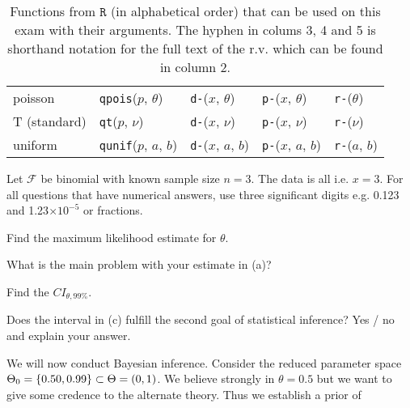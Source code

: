 \documentclass[12pt]{article}
\begin{document}
\begin{table}[htp]
\begin{tabular}{l | llll}

poisson & \texttt{qpois}($p$, $\theta$) 
& \texttt{d-}($x$, $\theta$)
& \texttt{p-}($x$, $\theta$) 
& \texttt{r-}($\theta$) \\

T (standard) & \texttt{qt}($p$, $\nu$) 
& \texttt{d-}($x$, $\nu$) 
& \texttt{p-}($x$, $\nu$)
& \texttt{r-}($\nu$) \\


uniform & \texttt{qunif}($p$, $a$, $b$) 
& \texttt{d-}($x$, $a$, $b$)
& \texttt{p-}($x$, $a$, $b$) 
& \texttt{r-}($a$, $b$) \\


\end{tabular}
\caption{Functions from $\texttt{R}$ (in alphabetical order) that can be used on this exam with their arguments. The hyphen in colums 3, 4 and 5 is shorthand notation for the full text of the r.v. which can be found in column 2.
}
\label{tab:eqs}
\end{table}

\problem Let $\mathcal{F}$ be binomial with known sample size $n = 3$. The data is all  i.e. $x = 3$. For all questions that have numerical answers, use three significant digits e.g. 0.123 and 1.23$\times 10^{-5}$ or fractions.

\benum

 Find the maximum likelihood estimate for $\theta$. 

 What is the main problem with your estimate in (a)? 

 Find the $CI_{\theta, 99\%}$. 

 Does the interval in (c) fulfill the second goal of statistical inference? Yes / no and explain your answer. 


 We will now conduct Bayesian inference. Consider the reduced parameter space $\Theta_0 = \left\{0.50, 0.99\right\} \subset \Theta = (0, 1)$. We believe strongly in $\theta = 0.5$ but we want to give some credence to the alternate theory. Thus we establish a prior of 
\end{document}
